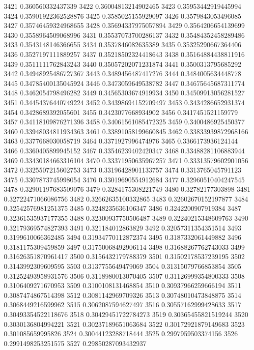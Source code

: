 3421 0.360560332437339
3422 0.36004813214902465
3423 0.35953442919445994
3424 0.35901922362528876
3425 0.3585025155929097
3426 0.3579843053496085
3427 0.35746459324968655
3428 0.35694337975057894
3429 0.3564206654139699
3430 0.3558964509068996
3431 0.35537073700286137
3432 0.35484352458289486
3433 0.3543148146366655
3434 0.3537846082635389
3435 0.35325290667364406
3436 0.3527197111889257
3437 0.35218502324418643
3438 0.35164884438811916
3439 0.3511111762843243
3440 0.35057202071231874
3441 0.3500313795685292
3442 0.34948925486727367
3443 0.3489456487417276
3444 0.3484005634448778
3445 0.34785400135045924
3446 0.3473059649538782
3447 0.34675645687311774
3448 0.3462054798496282
3449 0.34565303674919934
3450 0.34509913056281527
3451 0.34454376440749224
3452 0.34398694152709497
3453 0.3434286652931374
3454 0.3428689392055601
3455 0.3423077668934902
3456 0.3417451521159779
3457 0.34118109876271396
3458 0.34061561085472325
3459 0.3400486925450377
3460 0.33948034811934363
3461 0.33891058199660845
3462 0.33833939872968166
3463 0.3377668030058719
3464 0.3371927996474976
3465 0.3366173936124144
3466 0.3360405899945152
3467 0.33546239402420347
3468 0.33488281106883944
3469 0.33430184663316104
3470 0.33371950635967257
3471 0.33313579602901056
3472 0.3325507215602753
3473 0.33196428901133757
3474 0.3313765045791123
3475 0.3307873745998054
3476 0.33019690554912684
3477 0.32960510404247545
3478 0.32901197683509076
3479 0.3284175308221749
3480 0.32782177303898
3481 0.32722471066086756
3482 0.32662635100332865
3483 0.32602670152197877
3484 0.32542576981251375
3485 0.3248235636106347
3486 0.3242200907919384
3487 0.32361535937177355
3488 0.32300937750506487
3489 0.32240215348609763
3490 0.32179369574827393
3491 0.321184012863829
3492 0.32057311354351514
3493 0.3199610066362485
3494 0.31934770112872374
3495 0.3187332061449882
3496 0.3181175309459859
3497 0.31750068492906114
3498 0.31688267762743033
3499 0.31626351870961417
3500 0.3156432179788379
3501 0.31502178537239195
3502 0.3143992309609595
3503 0.3137755649479069
3504 0.31315079766853854
3505 0.31252493958931576
3506 0.3118980013070405
3507 0.31126999354800333
3508 0.3106409271670953
3509 0.3100108131468854
3510 0.30937966259666194
3511 0.3087474867514398
3512 0.3081142969709326
3513 0.30748010473848875
3514 0.3068449216599962
3515 0.3062087594627497
3516 0.30557162999428633
3517 0.30493354522118676
3518 0.30429451722784273
3519 0.30365455821519244
3520 0.3030136804994221
3521 0.30237189651063684
3522 0.30172921879149683
3523 0.301085659995826
3524 0.30044123288718444
3525 0.2997959503374156
3526 0.2991498253251575
3527 0.29850287093432937
